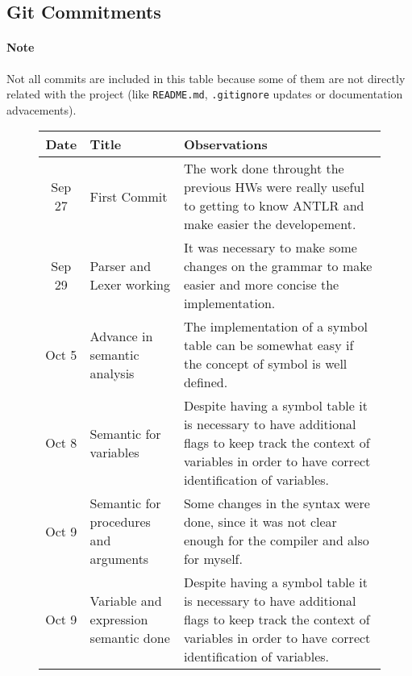 \newpage

\subsection{Git Commitments}
\paragraph{Note} Not all commits are included in this table because some of
them are not directly related with the project (like \texttt{README.md},
\texttt{.gitignore} updates or documentation advacements).

\begin{figure}[H]
    \centering
    \begin{tabular}{cp{1.25in}p{2.5in}}
        \toprule
        \textbf{Date} & \textbf{Title} & \textbf{Observations}\\
        \midrule
        Sep 27 & First Commit &
        The work done throught the previous HWs were really useful to getting
        to know ANTLR and make easier the \newline developement.\\

        \midrule
        Sep 29 & Parser and Lexer working &
        It was necessary to make some changes on the grammar to make easier
        and more concise the implementation.\\

        \midrule
        Oct  5 & Advance in semantic analysis &
        The implementation of a symbol table can be somewhat easy if the
        concept of symbol is well defined.\\

        \midrule
        Oct  8 & Semantic for \newline variables &
        Despite having a symbol table it is necessary to have additional
        flags to keep track the context of variables in order to have
        correct identification of variables.\\

        \midrule
        Oct  9 & Semantic for \newline procedures and \newline arguments &
        Some changes in the syntax were done, since it was not clear enough for 
        the compiler and also for myself.\\

        \midrule
        Oct  9 & Variable and \newline expression semantic done &
        Despite having a symbol table it is necessary to have additional
        flags to keep track the context of variables in order to have
        correct identification of variables.\\


\end{tabular}
\end{figure}
